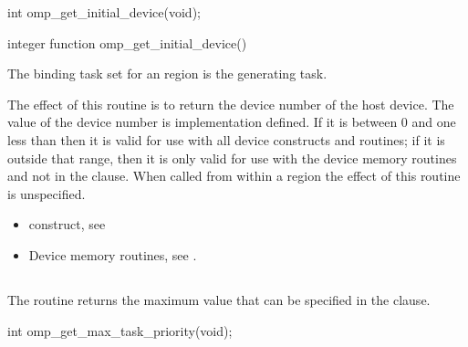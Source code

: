 \begin{samepage}
\format
\begin{ccppspecific}
\begin{ompcFunction}
int omp_get_initial_device(void);
\end{ompcFunction}
\end{ccppspecific}
\end{samepage}

\begin{fortranspecific}
\begin{ompfFunction}
integer function omp_get_initial_device()
\end{ompfFunction}
\end{fortranspecific}

\binding
The binding task set for an  region is the generating task.

\effect
The effect of this routine is to return the device number of the host device.
The value of the device number is implementation defined. If it is between 0
and one less than  then it is valid for use
with all device constructs and routines; if it is outside that range, then
it is only valid for use with the device memory routines and not in the
 clause. When called from within a  region
the effect of this routine is unspecified.

\crossreferences
\begin{itemize}
\item {} construct, see

\item Device memory routines, see .
\end{itemize}




\subsection{}
\label{subsec:omp_get_max_task_priority}
\summary

The  routine returns the maximum value that can be
specified in the  clause.

\begin{samepage}
\format
\begin{ccppspecific}
\begin{ompcFunction}
int omp_get_max_task_priority(void);
\end{ompcFunction}
\end{ccppspecific}
\end{samepage}

